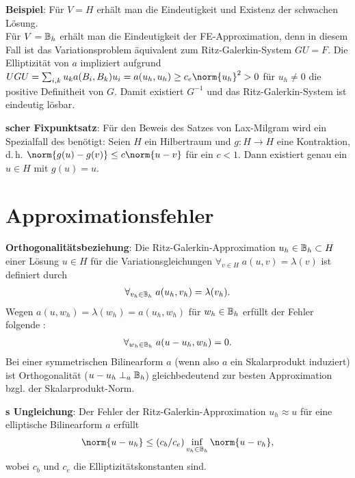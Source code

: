 \linie
\pagebreak

\textbf{Beispiel}:
Für $V = H$ erhält man die Eindeutigkeit und Existenz der schwachen Lösung.\\
Für $V = \mathbb{B}_h$ erhält man die Eindeutigkeit der FE-Approximation, denn in diesem Fall ist
das Variationsproblem äquivalent zum Ritz-Galerkin-System $GU = F$.
Die Elliptizität von $a$ impliziert aufgrund
$UGU = \sum_{i,k} u_k a(B_i, B_k) u_i = a(u_h, u_h) \ge c_e \norm{u_h}^2 > 0$
für $u_h \not= 0$ die positive Definitheit von $G$.
Damit existiert $G^{-1}$ und das Ritz-Galerkin-System ist eindeutig lösbar.

\textbf{scher Fixpunktsatz}:
Für den Beweis des Satzes von Lax-Milgram wird ein Spezialfall des
 benötigt:
Seien $H$ ein Hilbertraum und $g\colon H \rightarrow H$ eine Kontraktion, d.\,h.
$\norm{g(u) - g(v)} \le c \norm{u - v}$ für ein $c < 1$.
Dann existiert genau ein $u \in H$ mit $g(u) = u$.

\section{%
    Approximationsfehler%
}

\textbf{Orthogonalitätsbeziehung}:
Die Ritz-Galerkin-Approximation $u_h \in \mathbb{B}_h \subset H$ einer Lösung $u \in H$ für die
Variationsgleichungen $\forall_{v \in H}\; a(u, v) = \lambda(v)$
ist definiert durch
\begin{align*}
    \forall_{v_h \in \mathbb{B}_h}\; a(u_h, v_h) = \lambda(v_h).
\end{align*}
Wegen $a(u, w_h) = \lambda(w_h) = a(u_h, w_h)$ für $w_h \in \mathbb{B}_h$ erfüllt
der Fehler folgende :
\begin{align*}
    \forall_{w_h \in \mathbb{B}_h}\; a(u - u_h, w_h) = 0.
\end{align*}
Bei einer symmetrischen Bilinearform $a$ (wenn also $a$ ein Skalarprodukt induziert)
ist Orthogonalität ($u - u_h \perp_a \mathbb{B}_h$)
gleichbedeutend zur besten Approximation bzgl. der Skalarprodukt-Norm.

\linie

\textbf{s Ungleichung}:
Der Fehler der Ritz-Galerkin-Approximation $u_h \approx u$ für eine elliptische Bilinearform $a$
erfüllt
\begin{align*}
    \norm{u - u_h} \le (c_b/c_e) \inf_{v_h \in \BB_h} \norm{u - v_h},
\end{align*}
wobei $c_b$ und $c_e$ die Elliptizitätskonstanten sind.

